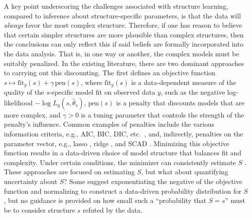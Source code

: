 \documentclass[12pt]{article}
\begin{document}
A key point underscoring the  challenges associated with structure learning, compared to inference about structure-specific parameters, is that the data will {\em always} favor the most complex structure.  Therefore, if one has reason to believe that certain simpler structures are more plausible than complex structures, then the conclusions can only reflect this if said beliefs are formally incorporated into the data analysis.  That is, in one way or another, the complex models must be suitably penalized.  In the existing literature, there are two dominant approaches to carrying out this discounting.  The first defines an objective function $s \mapsto \text{fit}_y(s) + \gamma \, \text{pen}(s)$, where $\text{fit}_y(s)$ is a data-dependent measure of the quality of the $s$-specific model fit on observed data $y$, such as the negative log-likelihood $-\log L_y(s, \hat\theta_s)$, $\text{pen}(s)$ is a penalty that discounts models that are more complex, and $\gamma > 0$ is a tuning parameter that controls the strength of the penalty's influence. Common examples of penalties include the various information criteria, e.g., AIC, BIC, DIC, etc.~\citep{akaike1973, schwarz1978, hurvich.tsai.1989, dic.2002}, and, indirectly, penalties on the parameter vector, e.g., lasso \citep{tibshirani1996regression}, ridge \citep{hoerl1970ridge}, and SCAD \citep{fan2001variable}. Minimizing this objective function results in a data-driven choice of model structure that balances fit and complexity. Under certain conditions, the minimizer can consistently estimate $S$ \cite[e.g.][]{bozdogan1987model, ding2018model, shao1993linear}. These approaches are focused on estimating $S$, but what about quantifying uncertainty about $S$?  Some suggest exponentiating the negative of the objective function and normalizing to construct a data-driven probability distribution for $S$, but no guidance is provided on how small such a ``probability that $S=s$'' must be to consider structure $s$ refuted by the data.  
\end{document}
